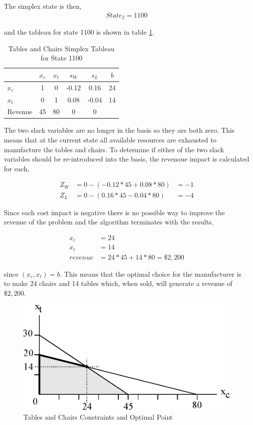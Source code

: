 The simplex state is then,
\begin{align*}
State_2 = 1100
\end{align*}

and the tableau for state 1100 is shown in table \ref{tab:tc1100}.

\begin{table}
\centering
\begin{tabular}{| l | c c c c | c |}
\hline
        & $x_c$ & $x_t$ & $s_W$ & $s_L$ & $b$\\
\hline
$x_c$   & 1    & 0    & -0.12   & 0.16     & 24\\
$x_t$   & 0    & 1    & 0.08    & -0.04    & 14\\
\hline
Revenue & 45    & 80    & 0     & 0     &\\
\hline
\end{tabular}
  \caption[Tables and Chairs Simplex Tableau for State 1100]
          {Tables and Chairs Simplex Tableau for State 1100}
  \label{tab:tc1100}
\end{table}

The two slack variables are no longer in the basis so they are both zero. This means that at the current state all available resources are exhausted to manufacture the tables and chairs. To determine if either of the two slack variables should be re-introduced into the basis, the revenoue impact is calculated for each,

\begin{align*}
Z_W &= 0 - (-0.12*45 + 0.08*80) &= -1\\
Z_L &= 0 - (0.16*45 - 0.04*80) &= -4
\end{align*}

Since each  cost impact is negative there is no possible way to improve the revenue of the problem and the algorithm terminates with the results,

\begin{align*}
x_c &= 24\\
x_t &= 14\\
revenue &= 24*45 + 14*80 = \$2,200
\end{align*}

since $(x_c, x_t) = b$. This means that the optimal choice for the manufacturer is to make 24 chairs and 14 tables which, when sold, will generate a revenue of $\$2,200$.

\begin{figure}
  \centering
  \includegraphics[width=120mm]{Images/tables_and_chairs}
  \caption[Tables and Chairs Constraints and Optimal Point]
          {Tables and Chairs Constraints and Optimal Point}
  \label{fig:tables_and_chairs}
\end{figure}

